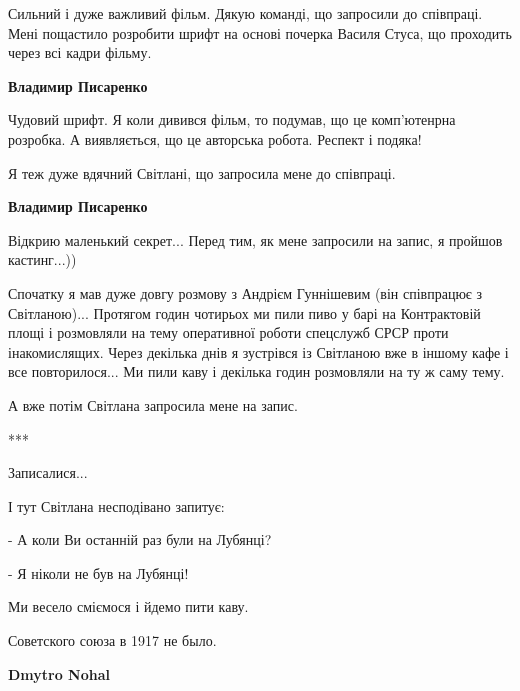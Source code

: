  
 
 
 
 
\zzSecCmt

\begin{itemize} %

Сильний і дуже важливий фільм. Дякую команді, що запросили до співпраці. Мені
пощастило розробити шрифт на основі почерка Василя Стуса, що проходить через
всі кадри фільму.

\begin{itemize} %
\textbf{Владимир Писаренко} 

Чудовий шрифт. Я коли дивився фільм, то подумав, що це комп'ютенрна розробка. А
виявляється, що це авторська робота. Респект і подяка!

Я теж дуже вдячний Світлані, що запросила мене до співпраці.

\textbf{Владимир Писаренко} 

Відкрию маленький секрет... Перед тим, як мене запросили на запис, я пройшов кастинг...))

Спочатку я мав дуже довгу розмову з Андрієм Гуннішевим (він співпрацює з
Світланою)... Протягом годин чотирьох ми пили пиво у барі на Контрактовій площі
і розмовляли на тему оперативної роботи спецслужб СРСР проти інакомислящих.
Через декілька днів я зустрівся із Світланою вже в іншому кафе і все
повторилося... Ми пили каву і декілька годин розмовляли на ту ж саму тему.

А вже потім Світлана запросила мене на запис.

***

Записалися...

І тут Світлана несподівано запитує:

- А коли Ви останній раз були на Лубянці?

- Я ніколи не був на Лубянці!

Ми весело сміємося і йдемо пити каву.
\end{itemize} %

Советского союза в 1917 не было.

\begin{itemize} %
\textbf{Dmytro Nohal} 


\end{itemize}
\end{itemize}

